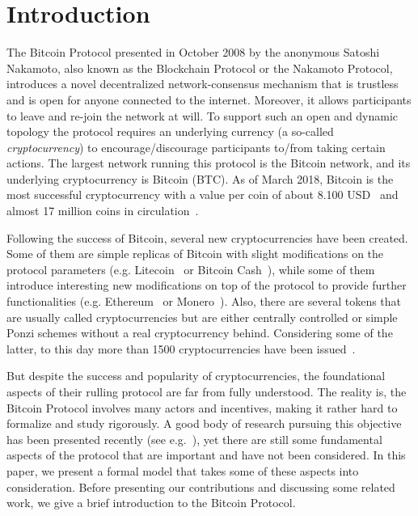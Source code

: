 
\section{Introduction}

The Bitcoin Protocol \cite{Bitcoin} presented in October 2008 by the anonymous Satoshi Nakamoto, also known as the Blockchain Protocol or the Nakamoto Protocol, introduces a novel decentralized network-consensus mechanism that is trustless and is open for anyone connected to the internet. Moreover, it allows participants to leave and re-join the network at will. To support such an open and dynamic topology the protocol requires an underlying currency (a so-called \emph{cryptocurrency}) to encourage/discourage participants to/from taking certain actions. The largest network running this protocol is the Bitcoin network, and its underlying cryptocurrency is Bitcoin (BTC). As of March 2018, Bitcoin is the most successful cryptocurrency with a value per coin of about 8.100 USD~\cite{BitcoinPrice} and almost 17 million coins in circulation~\cite{Totalcoins}.
 
Following the success of Bitcoin, several new cryptocurrencies have been created. Some of them are simple replicas of Bitcoin with slight modifications on the protocol parameters (e.g. Litecoin~\cite{Litecoin} or Bitcoin Cash~\cite{Bcash}), while some of them introduce interesting new modifications on top of the protocol to provide further functionalities (e.g. Ethereum~\cite{Ethereum} or Monero~\cite{Monero}). Also, there are several tokens that are usually called cryptocurrencies but are either centrally controlled or simple Ponzi schemes without a real cryptocurrency behind. Considering some of the latter, to this day more than 1500 cryptocurrencies have been issued~\cite{coinmarketcap}.

But despite the success and popularity of cryptocurrencies, the foundational aspects of their rulling protocol are far from fully understood. The reality is, the Bitcoin Protocol involves many actors and incentives, making it rather hard to formalize and study rigorously. A good body of research pursuing this objective has been presented recently (see e.g.~\cite{mininggames:2016,optimalselfishmining2017,instabilitywithoutreward:2016}), yet there are still some fundamental aspects of the protocol that are important and have not been considered. In this paper, we present a formal model that takes some of these aspects into consideration. Before presenting our contributions and discussing some related work, we give a brief introduction to the Bitcoin Protocol.

